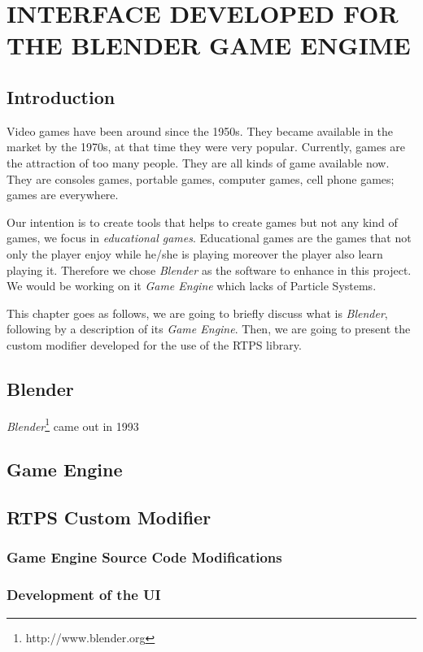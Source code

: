 \chapter{INTERFACE DEVELOPED FOR THE BLENDER GAME ENGIME}

\section{Introduction}

Video games have been around since the 1950s\cite{computerVideoGamesHistory}. They became available in the market by the 1970s, at that time they were very popular. Currently, games are the attraction of too many people. They are all kinds of game available now. They are consoles games, portable games, computer games, cell phone games; games are everywhere. 

Our intention is to create tools that helps to create games but not any kind of games, we focus in \textit{educational games}. Educational games are the games that not only the player enjoy while he/she is playing moreover the player also learn playing it. Therefore we chose \textit{Blender} as the software to enhance in this project. We would be working on it \textit{Game Engine} which lacks of Particle Systems.

This chapter goes as follows, we are going to briefly discuss what is \textit{Blender}, following by a description of its \textit{Game Engine}. Then, we are going to present the custom modifier developed for the use of the RTPS library.

\section{Blender}
\textit{Blender}\footnote{http://www.blender.org} came out in 1993

\section{Game Engine}

\section{RTPS Custom Modifier}

\subsection{Game Engine Source Code Modifications}

\subsection{Development of the UI}

